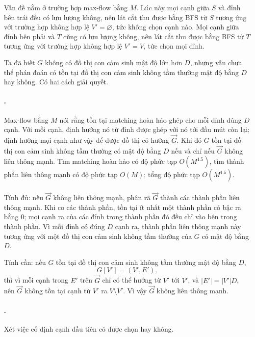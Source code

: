 \documentclass[11pt]{article}
\begin{document}
Vấn đề nằm ở trường hợp max-flow bằng \(M\). Lúc này mọi cạnh giữa \(S\) và
đỉnh bên trái đều có lưu lượng không, nên lát cắt thu được bằng BFS từ \(S\)
tương ứng với trường hợp không hợp lệ \(V'=\varnothing\), tức không chọn cạnh
nào. Mọi cạnh giữa đỉnh bên phải và \(T\) cũng có lưu lượng không, nên lát cắt
thu được bằng BFS từ \(T\) tương ứng với trường hợp không hợp lệ \(V'=V\), tức
chọn mọi đỉnh.

Ta đã biết \(G\) không có đồ thị con cảm sinh mật độ lớn hơn \(D\), nhưng vẫn
chưa thể phán đoán có tồn tại đồ thị con cảm sinh không tầm thường mật độ bằng
\(D\) hay không. Có hai cách giải quyết.

\paragraph{.}
Max-flow bằng \(M\) nói rằng tồn tại matching hoàn hảo ghép cho mỗi đỉnh đúng
\(D\) cạnh. Với mỗi cạnh, định hướng nó từ đỉnh được ghép với nó tới đầu mút
còn lại; định hướng mọi cạnh như vậy để được đồ thị có hướng \(\vec G\). Khi
đó \(G\) tồn tại đồ thị con cảm sinh không tầm thường có mật độ bằng \(D\) nếu
và chỉ nếu \(\vec G\) không liên thông mạnh. Tìm matching hoàn hảo có độ phức
tạp \(O(M^{1.5})\), tìm thành phần liên thông mạnh có độ phức tạp \(O(M)\);
tổng độ phức tạp \(O(M^{1.5})\).

\paragraph{}
Tính đủ: nếu \(\vec G\) không liên thông mạnh, phân rã \(\vec G\) thành các
thành phần liên thông mạnh. Khi co các thành phần, tồn tại ít nhất một thành
phần có bậc ra bằng \(0\); mọi cạnh ra của các đỉnh trong thành phần đó đều
chỉ vào bên trong thành phần. Vì mỗi đỉnh có đúng \(D\) cạnh ra, thành phần
liên thông mạnh này tương ứng với một đồ thị con cảm sinh không tầm thường của
\(G\) có mật độ bằng \(D\).

Tính cần: nếu \(G\) tồn tại đồ thị con cảm sinh không tầm thường mật độ bằng
\(D\),
\[
  G[V']=(V',E'),
\]
thì vì mỗi cạnh trong \(E'\) trên \(\vec G\) chỉ có thể hướng từ \(V'\) tới
\(V'\), và \(|E'|=|V'|D\), nên \(\vec G\) không tồn tại cạnh từ \(V'\) ra
\(V\setminus V'\). Vì vậy \(\vec G\) không liên thông mạnh.

\paragraph{.}
Xét việc cố định cạnh đầu tiên có được chọn hay không.
\end{document}
